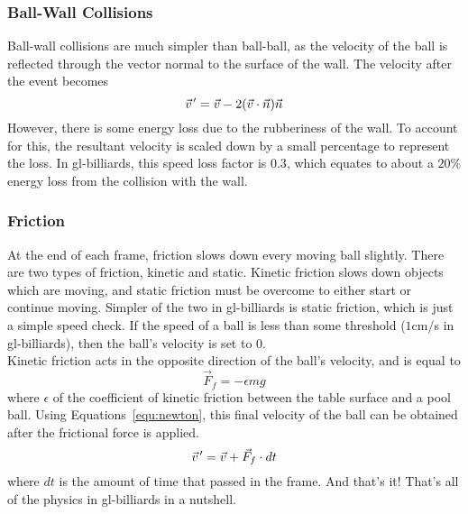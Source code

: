         \subsubsection{Ball-Wall Collisions}
        Ball-wall collisions are much simpler than ball-ball, as the velocity of the ball is reflected through the vector normal to the
        surface of the wall. The velocity after the event becomes
        \begin{equation}
            \pvec{v}' = \vec v - 2 (\vec v \cdot \vec n) \vec n
            \label{equ:after_ball_wall}
        \end{equation}
        However, there is some energy loss due to the rubberiness of the wall. To account for this, the resultant velocity is scaled down by
        a small percentage to represent the loss. In gl-billiards, this speed loss factor is $0.3$, which equates to about a $20\%$ energy
        loss from the collision with the wall.\\
        
        \subsubsection{Friction}
        At the end of each frame, friction slows down every moving ball slightly. There are two types of friction, kinetic and static.
        Kinetic friction slows down objects which are moving, and static friction must be overcome to either start or continue moving.
        Simpler of the two in gl-billiards is static friction, which is just a simple speed check. If the speed of a ball is less than
        some threshold ($1$cm/s in gl-billiards), then the ball's velocity is set to $0$. \\
        Kinetic friction acts in the opposite direction of the ball's velocity, and is equal to
        \begin{equation}
            \vec F_f = -\epsilon m g
            \label{equ:friction}
        \end{equation}
        where $\epsilon$ of the coefficient of kinetic friction between the table surface and a pool ball. Using Equations~\ref{equ:newton},
        this final velocity of the ball can be obtained after the frictional force is applied.
        \begin{equation}
            \pvec{v}' = \vec v + \vec F_f \cdot dt
            \label{equ:friction_velocity}
        \end{equation}
        where $dt$ is the amount of time that passed in the frame. And that's it! That's all of the physics in gl-billiards in a nutshell.
